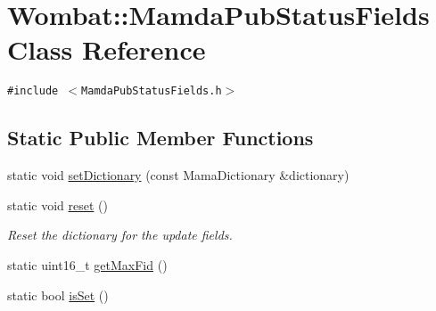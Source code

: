 \hypertarget{classWombat_1_1MamdaPubStatusFields}{
\section{Wombat::Mamda\-Pub\-Status\-Fields Class Reference}
\label{classWombat_1_1MamdaPubStatusFields}
}
{\tt \#include $<$Mamda\-Pub\-Status\-Fields.h$>$}

\subsection*{Static Public Member Functions}
\begin{CompactItemize}
\item 
static void \hyperlink{classWombat_1_1MamdaPubStatusFields_0244fb3aa4d6a3696bb88ecbdc4089b7}{set\-Dictionary} (const Mama\-Dictionary \&dictionary)
\item 
static void \hyperlink{classWombat_1_1MamdaPubStatusFields_1753a8e03e77d1bbda5d8a9c773ec855}{reset} ()
\begin{CompactList}\small\item\em Reset the dictionary for the update fields. \item\end{CompactList}\item 
static uint16\_\-t \hyperlink{classWombat_1_1MamdaPubStatusFields_06eeef5552c871dab84a2a4198b733de}{get\-Max\-Fid} ()
\item 
static bool \hyperlink{classWombat_1_1MamdaPubStatusFields_92488c941eeb098cc3af01e116a4c3d4}{is\-Set} ()
\end{CompactItemize}
